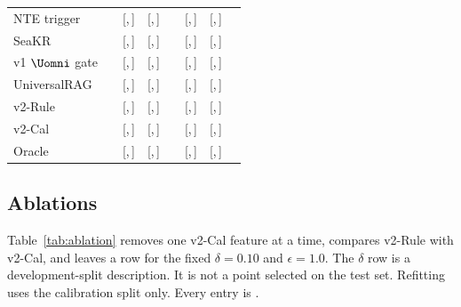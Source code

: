 \begin{table}[t]
\begin{tabular}{@{}lccccccc@{}}
NTE trigger & \ph{} & \ph{} [\ph{},\,\ph{}] & \ph{} [\ph{},\,\ph{}] & \ph{} & \ph{} [\ph{},\,\ph{}] & \ph{} [\ph{},\,\ph{}] & \ph{} \\
SeaKR & \ph{} & \ph{} [\ph{},\,\ph{}] & \ph{} [\ph{},\,\ph{}] & \ph{} & \ph{} [\ph{},\,\ph{}] & \ph{} [\ph{},\,\ph{}] & \ph{} \\
v1 $\Uomni$ gate & \ph{} & \ph{} [\ph{},\,\ph{}] & \ph{} [\ph{},\,\ph{}] & \ph{} & \ph{} [\ph{},\,\ph{}] & \ph{} [\ph{},\,\ph{}] & \ph{} \\
UniversalRAG & \ph{} & \ph{} [\ph{},\,\ph{}] & \ph{} [\ph{},\,\ph{}] & \ph{} & \ph{} [\ph{},\,\ph{}] & \ph{} [\ph{},\,\ph{}] & \ph{} \\
v2-Rule & \ph{} & \ph{} [\ph{},\,\ph{}] & \ph{} [\ph{},\,\ph{}] & \ph{} & \ph{} [\ph{},\,\ph{}] & \ph{} [\ph{},\,\ph{}] & \ph{} \\
v2-Cal & \ph{} & \ph{} [\ph{},\,\ph{}] & \ph{} [\ph{},\,\ph{}] & \ph{} & \ph{} [\ph{},\,\ph{}] & \ph{} [\ph{},\,\ph{}] & \ph{} \\
Oracle & \ph{} & \ph{} [\ph{},\,\ph{}] & \ph{} [\ph{},\,\ph{}] & \ph{} & \ph{} [\ph{},\,\ph{}] & \ph{} [\ph{},\,\ph{}] & \ph{} \\
\bottomrule
\end{tabular}
\end{table}

\subsection{Ablations}
\label{sec:ablation}
Table~\ref{tab:ablation} removes one v2-Cal feature at a time, compares v2-Rule with v2-Cal, and leaves a row for the fixed $\delta=0.10$ and $\epsilon=1.0$.
The $\delta$ row is a development-split description.
It is not a point selected on the test set.
Refitting uses the calibration split only.
Every entry is \ph{}.

